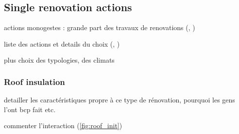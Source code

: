 \documentclass[11pt]{article}
\begin{document}
    \subsection{Single renovation actions} %
    \label{sub:single_renovation_actions}
    
    actions monogestes : grande part des travaux de renovations (\cite{ademe_typologie_2019}, \cite{onre_renovation_2022})


    liste des actions et details du choix (\cite{i4ce_trajectoires_2023}, \cite{peuportier_resiliance_2023})

    plus choix des typologies, des climats

        \subsubsection{Roof insulation} %
        \label{ssub:roof_insulation}
        
            detailler les caractéristiques propre à ce type de rénovation, pourquoi les gens l'ont bcp fait etc. 

            commenter l'interaction (\ref{fig:roof_init})
\end{document}
